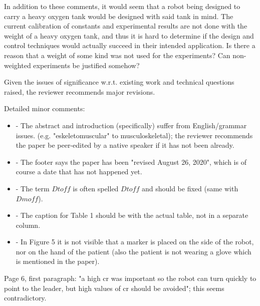 \documentclass[journal,onecolumn,12pt]{IEEEtran}
\begin{document}
\vspace{2em}

In addition to these comments, it would seem that a robot being designed to carry a heavy oxygen tank would be designed with said tank in mind. The current calibration of constants and experimental results are not done with the weight of a heavy oxygen tank, and thus it is hard to determine if the design and control techniques would actually succeed in their intended application. Is there a reason that a weight of some kind was not used for the experiments? Can non-weighted experiments be justified somehow?

\vspace{2em}

Given the issues of significance w.r.t. existing work and technical questions raised, the reviewer recommends major revisions.  

\vspace{2em}

Detailed minor comments:

\begin{itemize}
\item - The abstract and introduction (specifically) suffer from English/grammar issues. (e.g. "eskeletomuscular" to musculoskeletal); the reviewer recommends the paper be peer-edited by a native speaker if it has not been already.
\item - The footer says the paper has been "revised August 26, 2020", which is of course a date that has not happened yet.
\item - The term $Dt{off}$ is often spelled $Dt{o}ff$ and should be fixed (same with $Dm{off}$).
\item - The caption for Table 1 should be with the actual table, not in a separate column.
\item - In Figure 5 it is not visible that a marker is placed on the side of the robot, nor on the hand of the patient (also the patient is not wearing a glove which is mentioned in the paper).
\end{itemize}


Page 6, first paragraph: "a high cr was important so the robot can turn quickly to point to the leader, but high values of cr should be avoided"; this seems contradictory.

\section*{}
\end{document}
